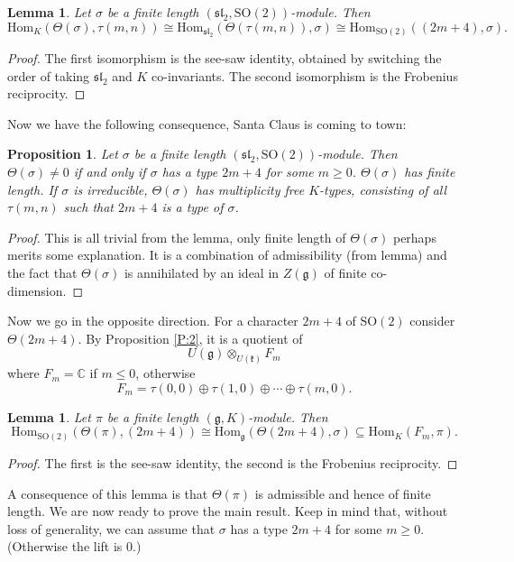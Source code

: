 \documentclass[11pt]{amsart}
\theoremstyle{plain}
\newtheorem{prop}[equation]{Proposition}
\newtheorem{lemma}[equation]{Lemma}
\numberwithin{equation}{section}
\newcommand{\Hom}{{\mathrm{Hom}}}
\newcommand{\SO}{{\mathrm{SO}}}
\begin{document}
\begin{lemma} \label{L:1} 
 Let $\sigma$ be a finite length $(\mathfrak{sl}_2,\SO(2))$-module. Then 
\[ 
\Hom_K(\Theta(\sigma), \tau(m,n)) \cong \Hom_{\mathfrak{sl}_2} (\Theta(\tau(m,n)), \sigma) \cong \Hom_{\SO(2)}( (2m+4) , \sigma). 
\] 
\end{lemma} 
\begin{proof} The first isomorphism is the see-saw identity, obtained by switching the order of taking $\mathfrak{sl}_2$ and $K$ co-invariants. 
The second isomorphism is the Frobenius reciprocity.  
\end{proof} 

Now we have the following consequence, Santa Claus is coming to town: 

\begin{prop} Let $\sigma$ be a finite length $(\mathfrak{sl}_2,\SO(2))$-module. Then $\Theta(\sigma)\neq 0$ if and only if $\sigma$ has a 
type $2m+4$ for some $m\geq 0$.  $\Theta(\sigma)$ has finite length. If $\sigma$ is irreducible, $\Theta(\sigma)$ has multiplicity free 
$K$-types, consisting of all $\tau(m,n)$ such that $2m+4$ is a type of $\sigma$. 
\end{prop} 
\begin{proof} This is all trivial from the lemma, only finite length of $\Theta(\sigma)$ perhaps merits some explanation. 
It is a combination of admissibility (from lemma) and the fact that 
$\Theta(\sigma)$ is annihilated by an ideal in $Z(\mathfrak g)$ of finite co-dimension.  
\end{proof} 

Now we go in the opposite direction. For a character $2m+4$ of $\SO(2)$ consider  $\Theta(2m+4)$. By Proposition \ref{P:2}, 
 it is a quotient of 
\[ 
U(\mathfrak g)\otimes_{U(\mathfrak k)} F_m 
\] 
where $F_m=\mathbb C$ if $m\leq 0$, otherwise  
\[ 
F_m=\tau(0,0) \oplus \tau(1,0) \oplus \cdots \oplus  \tau(m,0).  
\] 

\begin{lemma} Let $\pi$ be a finite length $(\mathfrak g, K)$-module. Then 
\[ 
\Hom_{\SO(2)}(\Theta(\pi), (2m+4) ) \cong \Hom_{\mathfrak g} (\Theta(2m+4), \sigma) \subseteq  \Hom_{K}(F_m, \pi).  
\]
\end{lemma} 
\begin{proof} The first is the see-saw identity, the second is the Frobenius reciprocity.  
\end{proof} 

A consequence of this lemma is that $\Theta(\pi)$ is admissible and hence of finite length. We are now ready to prove the main result. Keep in mind that, without loss 
of generality, we can assume that $\sigma$ has a type $2m+4$ for some $m\geq 0$. (Otherwise the lift is 0.) 
\end{document}
